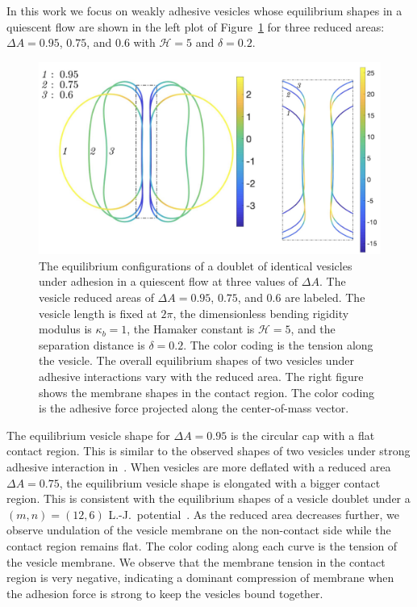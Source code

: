 \documentclass[prf,superscriptaddress,showkeys]{revtex4-1}
\begin{document}
In this work we focus on weakly adhesive vesicles whose equilibrium
shapes in a quiescent flow are shown in the left plot of
Figure~\ref{fig:Dec18_vesicle_shape} for three reduced areas: $\Delta
A=0.95$, $0.75$, and $0.6$ with $\mathcal{H}=5$ and $\delta = 0.2$. 
\begin{figure}
   \includegraphics[keepaspectratio=true,scale=0.45]{figs/Dec18_vesicle_shape_vs_rA_composite.png}
  \caption{\label{fig:Dec18_vesicle_shape} The equilibrium
  configurations of a doublet of identical vesicles under adhesion in a
  quiescent flow at three values of $\Delta A$.  The vesicle reduced
  areas of $\Delta A=0.95$, $0.75$, and $0.6$ are labeled.  The vesicle
  length is fixed at $2\pi$, the dimensionless bending rigidity modulus
  is $\kappa_b=1$, the Hamaker constant is $\mathcal{H}=5$, and the
  separation distance is $\delta=0.2$.  The color coding is the tension
  along the vesicle.  The overall equilibrium shapes of two vesicles
  under adhesive interactions vary with the reduced area.  The right
  figure shows the  membrane shapes in the contact region. The color
  coding is the adhesive force projected along the center-of-mass
  vector.} 
\end{figure}
The equilibrium vesicle shape for $\Delta A=0.95$ is the circular cap
with a flat contact region.  This is similar to the observed shapes of
two vesicles under strong adhesive interaction
in~\cite{RamachandranAndersonLealIsraelachvili2010_Langmuir}.  When
vesicles are more deflated with a reduced area $\Delta A = 0.75$, the
equilibrium vesicle shape is elongated with a bigger contact region.
This is consistent with the equilibrium shapes of a vesicle doublet
under a $(m,n) = (12,6)$
L.-J.~potential~\cite{FlormannAouane2017_SciReports}.  As the reduced
area decreases further, we observe undulation of the vesicle membrane on
the non-contact side while the contact region remains flat.  The color
coding along each curve is the tension of the vesicle membrane.  We
observe that the membrane tension in the contact region is very
negative, indicating a dominant compression of membrane when the
adhesion force is strong to keep the vesicles bound together.
\end{document}
